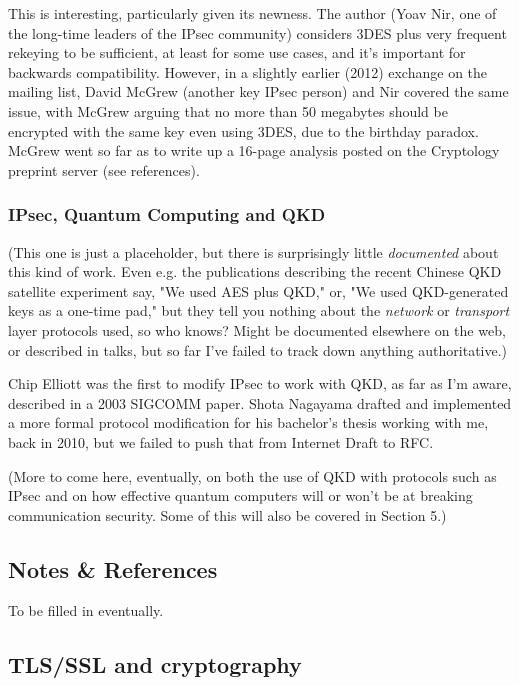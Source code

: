 \documentclass[%
 aip,
 jmp,%
 amsmath,amssymb,
 reprint,%
]{revtex4-1}
\begin{document}
This is interesting, particularly given its newness.  The author (Yoav
Nir, one of the long-time leaders of the IPsec community) considers
3DES plus very frequent rekeying to be sufficient, at least for some use
cases, and it's important for backwards compatibility.  However, in a
slightly earlier (2012) exchange on the mailing list, David McGrew
(another key IPsec person) and Nir covered the same issue, with McGrew
arguing that no more than 50 megabytes should be encrypted with the
same key even using 3DES, due to the birthday paradox.  McGrew went so
far as to write up a 16-page analysis posted on the Cryptology
preprint server (see references).

\subsubsection{IPsec, Quantum Computing and QKD}

(This one is just a placeholder, but there is surprisingly little
\emph{documented} about this kind of work.  Even e.g. the publications
describing the recent Chinese QKD satellite experiment say, "We used
AES plus QKD," or, "We used QKD-generated keys as a one-time pad," but
they tell you nothing about the \emph{network} or \emph{transport} layer
protocols used, so who knows?  Might be documented elsewhere on the
web, or described in talks, but so far I've failed to track down
anything authoritative.)

Chip Elliott was the first to modify IPsec to work with QKD, as far as
I'm aware, described in a 2003 SIGCOMM paper.  Shota Nagayama drafted
and implemented a more formal protocol modification for his bachelor's
thesis working with me, back in 2010, but we failed to push that from
Internet Draft to RFC.

(More to come here, eventually, on both the use of QKD with protocols
such as IPsec and on how effective quantum computers will or won't be
at breaking communication security.  Some of this will also be covered
in Section 5.)

\subsection{Notes \& References}

To be filled in eventually.

\subsection{TLS/SSL and cryptography}
\end{document}
